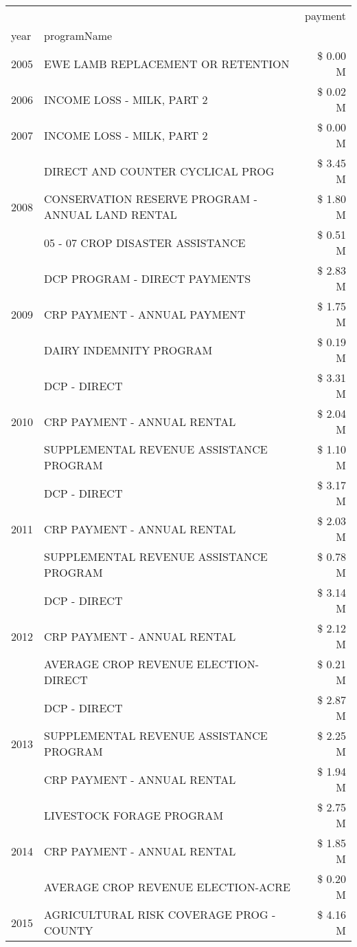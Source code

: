 \begin{tabular}{llr}
\toprule
 &  & payment \\
year & programName &  \\
\midrule
2005 & EWE LAMB REPLACEMENT OR RETENTION & \$ 0.00 M \\
\cline{1-3}
2006 & INCOME LOSS - MILK, PART 2 & \$ 0.02 M \\
\cline{1-3}
2007 & INCOME LOSS - MILK, PART 2 & \$ 0.00 M \\
\cline{1-3}
\multirow[t]{3}{*}{2008} & DIRECT AND COUNTER CYCLICAL PROG & \$ 3.45 M \\
 & CONSERVATION RESERVE PROGRAM - ANNUAL LAND RENTAL & \$ 1.80 M \\
 & 05 - 07 CROP DISASTER ASSISTANCE & \$ 0.51 M \\
\cline{1-3}
\multirow[t]{3}{*}{2009} & DCP PROGRAM - DIRECT PAYMENTS & \$ 2.83 M \\
 & CRP PAYMENT - ANNUAL PAYMENT & \$ 1.75 M \\
 & DAIRY INDEMNITY PROGRAM & \$ 0.19 M \\
\cline{1-3}
\multirow[t]{3}{*}{2010} & DCP - DIRECT & \$ 3.31 M \\
 & CRP PAYMENT - ANNUAL RENTAL & \$ 2.04 M \\
 & SUPPLEMENTAL REVENUE ASSISTANCE PROGRAM & \$ 1.10 M \\
\cline{1-3}
\multirow[t]{3}{*}{2011} & DCP - DIRECT & \$ 3.17 M \\
 & CRP PAYMENT - ANNUAL RENTAL & \$ 2.03 M \\
 & SUPPLEMENTAL REVENUE ASSISTANCE PROGRAM & \$ 0.78 M \\
\cline{1-3}
\multirow[t]{3}{*}{2012} & DCP - DIRECT & \$ 3.14 M \\
 & CRP PAYMENT - ANNUAL RENTAL & \$ 2.12 M \\
 & AVERAGE CROP REVENUE ELECTION-DIRECT & \$ 0.21 M \\
\cline{1-3}
\multirow[t]{3}{*}{2013} & DCP - DIRECT & \$ 2.87 M \\
 & SUPPLEMENTAL REVENUE ASSISTANCE PROGRAM & \$ 2.25 M \\
 & CRP PAYMENT - ANNUAL RENTAL & \$ 1.94 M \\
\cline{1-3}
\multirow[t]{3}{*}{2014} & LIVESTOCK FORAGE PROGRAM & \$ 2.75 M \\
 & CRP PAYMENT - ANNUAL RENTAL & \$ 1.85 M \\
 & AVERAGE CROP REVENUE ELECTION-ACRE & \$ 0.20 M \\
\cline{1-3}
\multirow[t]{3}{*}{2015} & AGRICULTURAL RISK COVERAGE PROG - COUNTY & \$ 4.16 M \\

\end{tabular}
